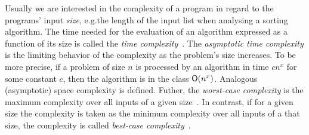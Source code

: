 \documentclass[envcountsame]{llncs}
\begin{document}
Usually we are interested in the complexity of a program in regard to the programs' input
\textit{size}, e.g.\@ the length of the input list when analysing a sorting algorithm.
%
The time needed for the evaluation of an algorithm expressed as a function of its size is called the
\textit{time complexity}~\cite{Aho:1974:DAC:578775}. The \textit{asymptotic time complexity} is the
limiting behavior of the complexity as the problem's size increases. To be more precise, if a
problem of size \(n\) is processed by an algorithm in time \(c n^{x}\) for some constant \(c\), then
the algorithm is in the class \(\mathsf{O}(n^{x})\). Analogous (asymptotic) space complexity is defined.
Futher, the \textit{worst-case complexity} is the maximum complexity over all inputs of a given
size~\cite{Aho:1974:DAC:578775}. In contrast, if for a given size the complexity is taken as the
minimum complexity over all inputs of a that size, the complexity is called \textit{best-case
  complexity}~\cite{Wegbreit75}.






\end{document}
